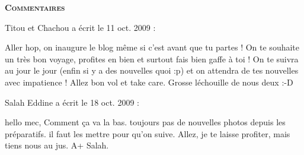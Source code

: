 \bigskip
\textbf{\textsc{Commentaires}}

\medskip
Titou et Chachou a écrit le 11 oct. 2009 :
\begin{displayquote}
Aller hop, on inaugure le blog même si c'est avant que tu partes !
On te souhaite un très bon voyage, profites en bien et surtout fais bien gaffe à toi !
On te suivra au jour le jour (enfin si y a des nouvelles quoi :p) et on attendra de tes nouvelles avec impatience !
Allez bon vol et take care.
Grosse léchouille de nous deux :-D
\end{displayquote}

\medskip
Salah Eddine a écrit le 18 oct. 2009 :
\begin{displayquote}
hello mec,
Comment ça va la bas. toujours pas de nouvelles photos depuis les préparatifs. il faut les mettre pour qu'on suive.
Allez, je te laisse profiter, mais tiens nous au jus.
A+
Salah.
\end{displayquote}
